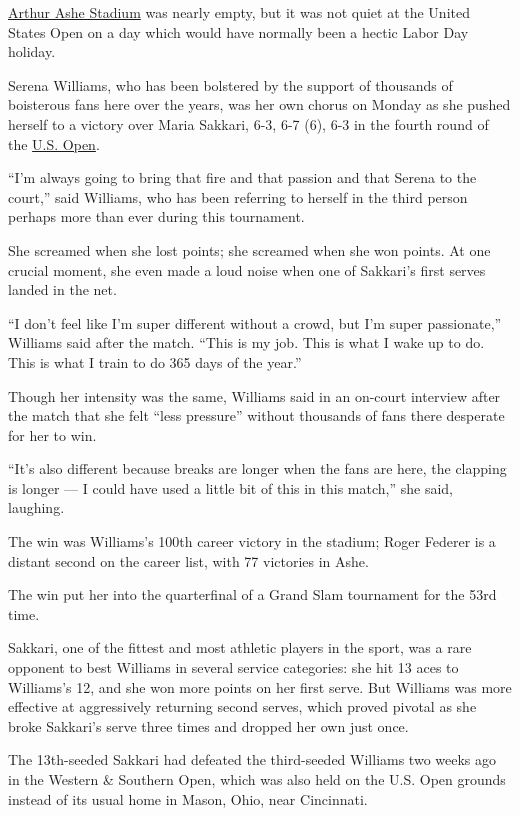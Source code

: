 \href{https://www.nytimes3xbfgragh.onion/2020/09/06/sports/tennis/djokovic-us-open-moments.html}{Arthur
Ashe Stadium} was nearly empty, but it was not quiet at the United
States Open on a day which would have normally been a hectic Labor Day
holiday.

Serena Williams, who has been bolstered by the support of thousands of
boisterous fans here over the years, was her own chorus on Monday as she
pushed herself to a victory over Maria Sakkari, 6-3, 6-7 (6), 6-3 in the
fourth round of the
\href{https://www.nytimes3xbfgragh.onion/2020/09/08/sports/2020-us-open.html}{U.S.
Open}.

``I'm always going to bring that fire and that passion and that Serena
to the court,'' said Williams, who has been referring to herself in the
third person perhaps more than ever during this tournament.

She screamed when she lost points; she screamed when she won points. At
one crucial moment, she even made a loud noise when one of Sakkari's
first serves landed in the net.

``I don't feel like I'm super different without a crowd, but I'm super
passionate,'' Williams said after the match. ``This is my job. This is
what I wake up to do. This is what I train to do 365 days of the year.''

Though her intensity was the same, Williams said in an on-court
interview after the match that she felt ``less pressure'' without
thousands of fans there desperate for her to win.

``It's also different because breaks are longer when the fans are here,
the clapping is longer --- I could have used a little bit of this in
this match,'' she said, laughing.

The win was Williams's 100th career victory in the stadium; Roger
Federer is a distant second on the career list, with 77 victories in
Ashe.

The win put her into the quarterfinal of a Grand Slam tournament for the
53rd time.

Sakkari, one of the fittest and most athletic players in the sport, was
a rare opponent to best Williams in several service categories: she hit
13 aces to Williams's 12, and she won more points on her first serve.
But Williams was more effective at aggressively returning second serves,
which proved pivotal as she broke Sakkari's serve three times and
dropped her own just once.

The 13th-seeded Sakkari had defeated the third-seeded Williams two weeks
ago in the Western \& Southern Open, which was also held on the U.S.
Open grounds instead of its usual home in Mason, Ohio, near Cincinnati.

